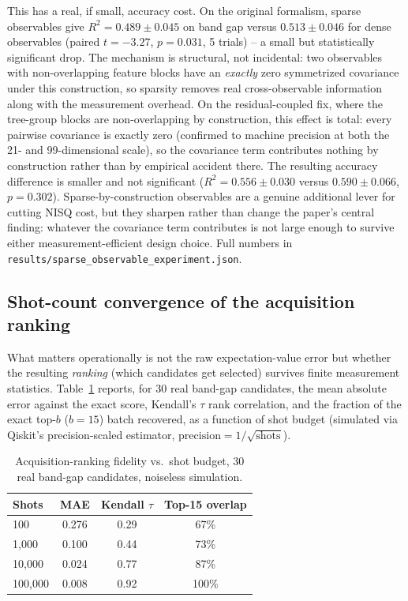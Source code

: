 \documentclass[conference]{IEEEtran}
\begin{document}
This has a real, if small, accuracy cost. On the original formalism, sparse observables give $R^2=0.489\pm0.045$ on band gap versus $0.513\pm0.046$ for dense observables (paired $t=-3.27$, $p=0.031$, 5 trials) -- a small but statistically significant drop. The mechanism is structural, not incidental: two observables with non-overlapping feature blocks have an \emph{exactly} zero symmetrized covariance under this construction, so sparsity removes real cross-observable information along with the measurement overhead. On the residual-coupled fix, where the tree-group blocks are non-overlapping by construction, this effect is total: every pairwise covariance is exactly zero (confirmed to machine precision at both the 21- and 99-dimensional scale), so the covariance term contributes nothing by construction rather than by empirical accident there. The resulting accuracy difference is smaller and not significant ($R^2=0.556\pm0.030$ versus $0.590\pm0.066$, $p=0.302$). Sparse-by-construction observables are a genuine additional lever for cutting NISQ cost, but they sharpen rather than change the paper's central finding: whatever the covariance term contributes is not large enough to survive either measurement-efficient design choice. Full numbers in \texttt{results/sparse\_observable\_experiment.json}.

\subsection{Shot-count convergence of the acquisition ranking}

What matters operationally is not the raw expectation-value error but whether the resulting \emph{ranking} (which candidates get selected) survives finite measurement statistics. Table~\ref{tab:shots} reports, for 30 real band-gap candidates, the mean absolute error against the exact score, Kendall's $\tau$ rank correlation, and the fraction of the exact top-$b$ ($b{=}15$) batch recovered, as a function of shot budget (simulated via Qiskit's precision-scaled estimator, $\mathrm{precision}=1/\sqrt{\mathrm{shots}}$).

\begin{table}[!t]
\centering
\caption{Acquisition-ranking fidelity vs.\ shot budget, 30 real band-gap candidates, noiseless simulation.}
\label{tab:shots}
\begin{tabular}{lccc}
\toprule
Shots & MAE & Kendall $\tau$ & Top-15 overlap \\
\midrule
100 & 0.276 & 0.29 & 67\% \\
1{,}000 & 0.100 & 0.44 & 73\% \\
10{,}000 & 0.024 & 0.77 & 87\% \\
100{,}000 & 0.008 & 0.92 & 100\% \\
\bottomrule
\end{tabular}
\end{table}
\end{document}
